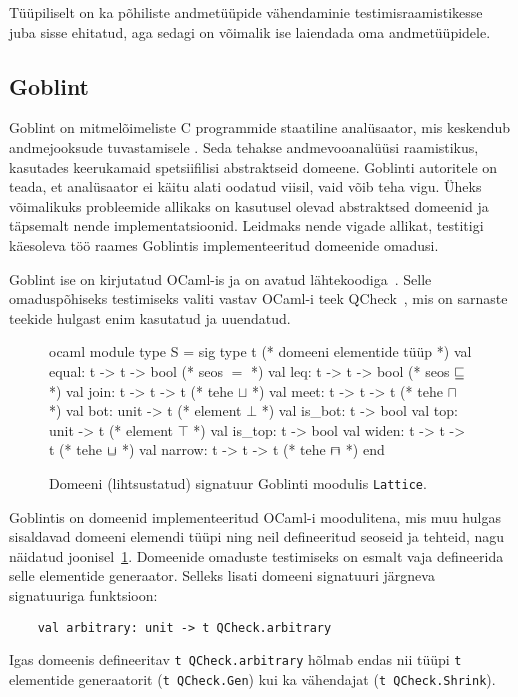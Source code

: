 \documentclass[../thesis.tex]{subfiles}
\begin{document}
Tüüpiliselt on ka põhiliste andmetüüpide vähendaminie testimisraamistikesse juba sisse ehitatud, aga sedagi on võimalik ise laiendada oma andmetüüpidele.

\subsection{Goblint}
Goblint on mitmelõimeliste C programmide staatiline analüsaator, mis keskendub andmejooksude tuvastamisele \cite{goblint2016}. Seda tehakse andmevooanalüüsi raamistikus, kasutades keerukamaid spetsiifilisi abstraktseid domeene. Goblinti autoritele on teada, et analüsaator ei käitu alati oodatud viisil, vaid võib teha vigu. Üheks võimalikuks probleemide allikaks on kasutusel olevad abstraktsed domeenid ja täpsemalt nende implementatsioonid. Leidmaks nende vigade allikat, testitigi käesoleva töö raames Goblintis implementeeritud domeenide omadusi.

Goblint ise on kirjutatud OCaml-is ja on avatud lähtekoodiga~\cite{goblint_repo}. Selle omaduspõhiseks testimiseks valiti vastav OCaml-i teek QCheck~\cite{qcheck_repo}, mis on sarnaste teekide hulgast enim kasutatud ja uuendatud.

\begin{figure}
	\centering
	\begin{bminted}[mathescape]{ocaml}
		module type S =
		sig
		  type t (* domeeni elementide tüüp *)
		  val equal: t -> t -> bool (* seos $=$ *)
		  val leq: t -> t -> bool (* seos $\sqsubseteq$ *)
		  val join: t -> t -> t (* tehe $\sqcup$ *)
		  val meet: t -> t -> t (* tehe $\sqcap$ *)
		  val bot: unit -> t (* element $\bot$ *)
		  val is_bot: t -> bool
		  val top: unit -> t (* element $\top$ *)
		  val is_top: t -> bool
		  val widen: t -> t -> t (* tehe $\widen$ *)
		  val narrow: t -> t -> t (* tehe $\narrow$ *)
		end
	\end{bminted}
	\caption{Domeeni (lihtsustatud) signatuur Goblinti moodulis \texttt{Lattice}.}
	\label{fig:lattice-s}
\end{figure}

Goblintis on domeenid implementeeritud OCaml-i moodulitena, mis muu hulgas sisaldavad domeeni elemendi tüüpi ning neil defineeritud seoseid ja tehteid, nagu näidatud joonisel~\ref{fig:lattice-s}. Domeenide omaduste testimiseks on esmalt vaja defineerida selle elementide generaator. Selleks lisati domeeni signatuuri järgneva signatuuriga funktsioon:
\begin{verbatim}
	val arbitrary: unit -> t QCheck.arbitrary
\end{verbatim}
Igas domeenis defineeritav \texttt{t QCheck.arbitrary} hõlmab endas nii tüüpi \texttt{t} elementide generaatorit (\texttt{t QCheck.Gen}) kui ka vähendajat (\texttt{t QCheck.Shrink}).
\end{document}

